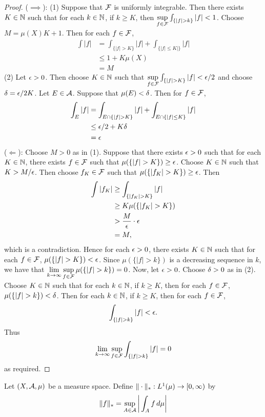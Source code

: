 \documentclass{book}
\begin{document}
	\begin{proof}
		($\implies$): (1) Suppose that $\mathcal{F}$ is uniformly integrable. Then there exists $K \in \mathbb{N}$ such that for each $k \in \mathbb{N}$, if $k \geq K$, then $\sup\limits_{f \in \MF} \int_{\{|f|>k\}} |f| < 1$. Choose $M = \mu(X)K + 1$. Then for each $f \in \mathcal{F}$, 
		\begin{align*}
			\int |f| 
			&= \int_{\{|f|>K\}} |f| + \int_{\{|f| \leq K|\}}|f|\\
			& \leq 1 + K\mu(X)\\
			&=M
		\end{align*}
		(2) Let $\epsilon >0$. Then choose $K \in \mathbb{N}$ such that $\sup\limits_{f \in \MF}\int_{\{|f|>K\}} |f| < \ep/2$ and choose $\delta = \epsilon/2K$. Let $E \in \mathcal{A}$. Suppose that $\mu(E) < \delta$. Then for $f \in \mathcal{F}$, 
		\begin{align*}
			\int_E |f| 
			&= \int_{E \cap \{|f| > K\}} |f| + \int_{E \cap \{|f| \leq K\}} |f|\\
			& \leq \epsilon/2 + K\delta \\
			&=  \epsilon
		\end{align*}
		($\Leftarrow$): Choose $M >0$ as in (1). Suppose that there exists $\epsilon >0$ such that for each $K \in \mathbb{N}$, there exists $f \in \mathcal{F}$ such that $\mu(\{|f| > K\}) \geq \epsilon$. Choose $K \in \mathbb{N}$ such that $K > M/\epsilon$. Then choose $f_K \in \mathcal{F}$ such that $\mu(\{|f_K| > K\}) \geq \epsilon$. Then 
		\begin{align*}
			\int |f_K| 
			&\geq \int_{\{|f_K| > K\}} |f|\\
			& \geq K\mu(\{|f_K| > K\})\\
			& > \frac{M}{\epsilon} \cdot \epsilon\\
			&= M, \\
		\end{align*}  
		which is a contradiction. Hence for each $\epsilon >0$, there exists $K \in \mathbb{N}$ such that for each $f \in \mathcal{F}$, $\mu(\{|f| > K\}) < \epsilon$. Since $\mu(\{|f| > k\})$ is a decreasing sequence in $k$, we have that $\lim\limits_{k \rightarrow \infty} \sup\limits_{f \in \mathcal{F}} \mu(\{|f| > k\}) = 0$. Now, let $\epsilon > 0$. Choose $\delta >0$ as in (2). Choose $K \in \mathbb{N}$ such that for each $k \in \mathbb{N}$, if $k \geq K$, then for each $f \in \mathcal{F}$, $\mu(\{|f| > k\}) < \delta$. Then for each $k \in \mathbb{N}$, if $k \geq K$, then for each $f \in \mathcal{F}$, 
		$$\int_{\{|f| > k\}} |f| < \epsilon.$$ Thus $$\lim\limits_{k \rightarrow \infty} \sup\limits_{f \in \MF} \int_{\{|f|>k\}} |f| = 0$$ as required.
	\end{proof}
	
	\begin{defn} 
	Let $(X, \mathcal{A}, \mu)$ be a measure space. Define $\| \cdot \|_*: L^1(\mu) \rightarrow [0,\infty)$ by  
	 $$\| f \|_* = \sup_{A \in \mathcal{A}} \bigg | \int_A f \, d \mu \bigg |$$ 
	\end{defn}
	
\end{document}
